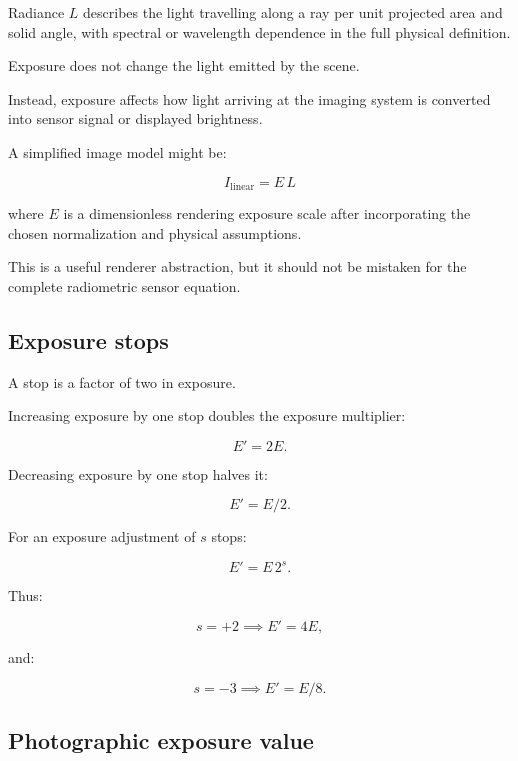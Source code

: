 \hypertarget{02-foundations-ii-ch036-exposure-versus-scene-radiance}{}

Radiance \(L\) describes the light travelling along a ray per unit projected area and solid angle, with spectral or wavelength dependence in the full physical definition.

Exposure does not change the light emitted by the scene.

Instead, exposure affects how light arriving at the imaging system is converted into sensor signal or displayed brightness.

A simplified image model might be:

\[ \boxed{ I_{\mathrm{linear}}=E\,L } \]

where \(E\) is a dimensionless rendering exposure scale after incorporating the chosen normalization and physical assumptions.

This is a useful renderer abstraction, but it should not be mistaken for the complete radiometric sensor equation.

\subsection{Exposure stops}\label{02-foundations-ii-ch036-exposure-stops}

\hypertarget{02-foundations-ii-ch036-exposure-stops}{}

A stop is a factor of two in exposure.

Increasing exposure by one stop doubles the exposure multiplier:

\[ \boxed{E'=2E}. \]

Decreasing exposure by one stop halves it:

\[ \boxed{E'=E/2}. \]

For an exposure adjustment of \(s\) stops:

\[ \boxed{ E'=E\,2^s. } \]

Thus:

\[ s=+2\implies E'=4E, \]

and:

\[ s=-3\implies E'=E/8. \]

\subsection{Photographic exposure value}\label{02-foundations-ii-ch036-photographic-exposure-value}

\hypertarget{02-foundations-ii-ch036-photographic-exposure-value}{}

